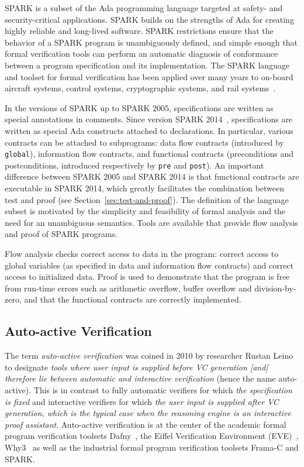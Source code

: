 \documentclass[11pt,a4paper]{article}
\begin{document}
SPARK is a subset of the Ada programming language targeted at safety-
and security-critical applications. SPARK builds on the strengths of
Ada for creating highly reliable and long-lived software. SPARK
restrictions ensure that the behavior of a SPARK program is
unambiguously defined, and simple enough that formal verification
tools can perform an automatic diagnosis of conformance between a
program specification and its implementation. The SPARK language and
toolset for formal verification has been applied over many years to
on-board aircraft systems, control systems, cryptographic systems, and
rail systems~\cite{sparkbook2012,oneill2012}.

In the versions of SPARK up to SPARK 2005, specifications are written as
special annotations in comments. Since version SPARK 2014~\cite{sparkERTS2014},
specifications are written as special Ada constructs attached to
declarations. In particular, various contracts can be attached to subprograms:
data flow contracts (introduced by \texttt{global}), information flow contracts,
and functional contracts (preconditions and postconditions, introduced
respectively by \texttt{pre} and \texttt{post}). An important difference
between SPARK 2005 and SPARK 2014 is that functional contracts are executable in
SPARK 2014, which greatly facilitates the combination between test and proof
(see Section~\ref{sec:test-and-proof}). The definition of the language subset
is motivated by the simplicity and feasibility of formal analysis and the need
for an unambiguous semantics. Tools are available that provide flow analysis
and proof of SPARK programs.

Flow analysis checks correct access to data in the program: correct access to
global variables (as specified in data and information flow contracts) and
correct access to initialized data. Proof is used to demonstrate that the
program is free from run-time errors such as arithmetic overflow, buffer
overflow and division-by-zero, and that the functional contracts are correctly
implemented.

\subsection{Auto-active Verification}
\label{sec-prelim-auto-active}

The term \emph{auto-active verification} was coined in 2010 by researcher
Rustan Leino~\cite{Leino10usableauto-active} to designate \textit{tools where
  user input is supplied before VC generation [and] therefore lie between
  automatic and interactive verification} (hence the name auto-active). This is
in contrast to fully automatic verifiers for which \textit{the specification is
  fixed} and interactive verifiers for which \textit{the user input is supplied
  after VC generation, which is the typical case when the reasoning engine is
  an interactive proof assistant}. Auto-active verification is at the center of
the academic formal program verification toolsets Dafny~\cite{Leino2010Dafny},
the Eiffel Verification Environment (EVE)~\cite{Furia2016},
Why3~\cite{filliatre2013Why3} as well as the industrial formal program
verification toolsets Frama-C and SPARK.
\end{document}
